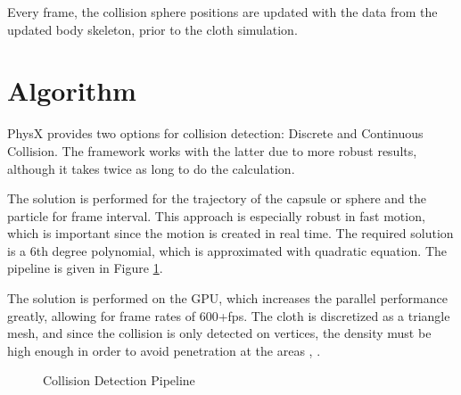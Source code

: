 Every frame, the collision sphere positions are updated with the data from the updated body skeleton, prior to the cloth simulation. 

\section{Algorithm}

PhysX provides two options for collision detection: Discrete and Continuous Collision. The framework works with the latter due to more robust results, although it takes twice
 as long to do the calculation.

The solution is performed for the trajectory of the capsule or sphere and the particle for frame interval. This approach is especially robust in fast motion, which is important
 since the motion is created in real time. The required solution is a 6th degree polynomial, which is approximated with quadratic equation. The pipeline is given in Figure
  \ref{fig:collision_pipeline}.

The solution is performed on the GPU, which increases the parallel performance greatly, allowing for frame rates of 600+fps. The cloth is discretized as a triangle mesh, and since the collision is only detected on vertices, the density must be high enough in order to avoid penetration at the areas \cite{Kim2011}, \cite{Tonge2010}. 

\begin{figure}[h]
\centerline{}
\caption{Collision Detection Pipeline \cite{Tonge2010} }
\label{fig:collision_pipeline}
\end{figure}